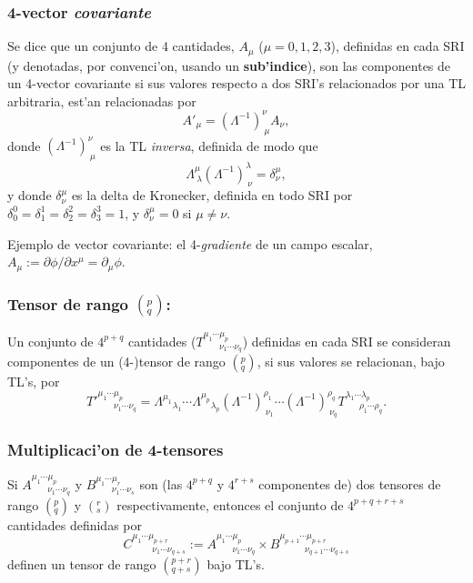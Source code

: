 \subsubsection{4-vector \textit{covariante}}
Se dice que un conjunto de 4 cantidades, $A_\mu$ ($\mu=0,1,2,3$), definidas en cada SRI (y denotadas, por convenci'on, usando un \textbf{sub'indice}), son las componentes de un 4-vector covariante si sus valores respecto a dos SRI's relacionados por una TL arbitraria, est'an relacionadas por
\begin{equation}
A'_\mu=\left( \Lambda^{-1}\right)^\nu _{\ \mu}A_{\nu},
\end{equation}
donde $\left( \Lambda^{-1}\right)^\nu _{\ \mu}$ es la TL \textit{inversa}, definida de modo que
\begin{equation}
\Lambda^\mu_{\ \lambda}\left( \Lambda^{-1}\right)^{\lambda}_{\
\nu}=\delta^\mu_\nu ,
\end{equation}
y donde $\delta^\mu_\nu$ es la delta de Kronecker, definida en todo SRI por 
$\delta^0_0=\delta^1_1=\delta^2_2=\delta^3_3=1$, y $\delta^\mu_\nu=0$ si
$\mu\neq\nu$. 

Ejemplo de vector covariante: el 4-\textit{gradiente} de un campo escalar, $A_\mu:={\partial\phi}/{\partial x^\mu}=\partial_\mu\phi$.

\subsubsection{Tensor de rango $(^p_q)$:}
Un conjunto de $4^{p+q}$ cantidades ($T^{\mu_1 \cdots\mu_p}_{\ \ \ \ \ \ \ \
\nu_1\cdots\nu_q}$) definidas en cada SRI se consideran componentes de un (4-)tensor de rango $(^p_q)$, si sus valores se relacionan, bajo TL's, por
\begin{equation}
T'^{\mu_1 \cdots\mu_p}_{\ \ \ \ \ \ \ \
\nu_1\cdots\nu_q}={\Lambda^{\mu_1}}_{\lambda_1} \cdots
{\Lambda^{\mu_p}}_{\lambda_p} \left( \Lambda^{-1}\right) ^{\rho_1}_{\
\nu_1}\cdots\left( \Lambda^{-1}\right) ^{\rho_q}_{\ \nu_q} T^{\lambda_1
\cdots\lambda_p}_{\ \ \ \ \ \ \ \rho_1\cdots\rho_q}. 
\end{equation}

\subsubsection{Multiplicaci'on de 4-tensores}
 Si $A^{\mu_1 \cdots\mu_p}_{\ \ \ \ \ \ \ \
\nu_1\cdots\nu_q}$ y $B^{\mu_1 \cdots\mu_r}_{\ \ \ \ \ \ \ \
\nu_1\cdots\nu_s}$ son (las $4^{p+q}$ y $4^{r+s}$ componentes de) dos tensores de rango $(^p_q)$ y $(^r_s)$ respectivamente, entonces el
conjunto de $4^{p+q+r+s}$ cantidades definidas por
\begin{equation}
C^{\mu_1 \cdots\mu_{p+r}}_{\ \ \ \ \ \ \ \ \ \
\nu_1\cdots\nu_{q+s}}:=A^{\mu_1 \cdots\mu_p}_{\ \ \ \ \ \ \ \
\nu_1\cdots\nu_q}\times B^{\mu_{p+1} \cdots\mu_{p+r}}_{\ \ \ \ \ \ \ \ \ \ \ \ \, \nu_{q+1}\cdots\nu_{q+s}}
\end{equation}
definen un tensor de rango $(^{p+r}_{q+s})$ bajo TL's.


